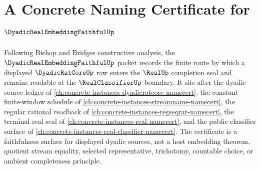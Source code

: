 \chapter{A Concrete Naming Certificate for $\DyadicRealEmbeddingFaithfulUp$}
\label{ch:concrete-instances-dyadic-real-embedding-faithful-namecert}

Following Bishop and Bridges constructive analysis, the $\DyadicRealEmbeddingFaithfulUp$ packet records the finite route by which a displayed $\DyadicRatCoreUp$ row enters the $\RealUp$ completion seal and remains readable at the $\RealClassifierUp$ boundary. It sits after the dyadic source ledger of \autoref{ch:concrete-instances-dyadicratcore-namecert}, the constant finite-window schedule of \autoref{ch:concrete-instances-streamname-namecert}, the regular rational readback of \autoref{ch:concrete-instances-regseqrat-namecert}, the terminal real seal of \autoref{ch:concrete-instances-real-namecert}, and the public classifier surface of \autoref{ch:concrete-instances-real-classifier-namecert}. The certificate is a faithfulness surface for displayed dyadic sources, not a host embedding theorem, quotient stream equality, selected representative, trichotomy, countable choice, or ambient completeness principle.

